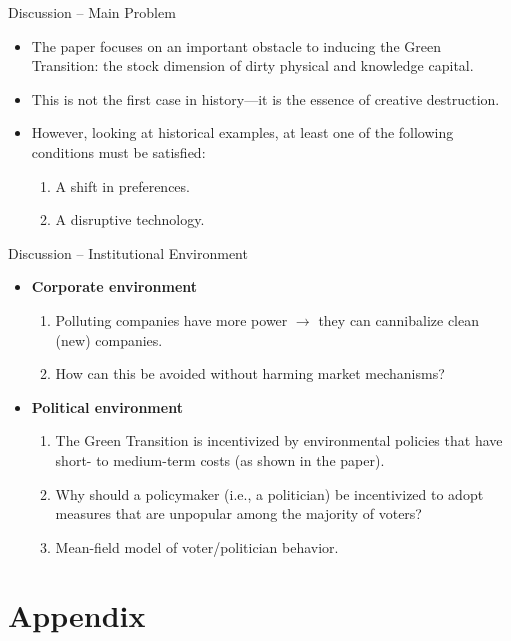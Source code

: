 \documentclass[aspectratio=169,xcolor=dvipsnames]{beamer}
\begin{document}
\begin{frame}{Discussion – Main Problem}
      \begin{itemize}
        \item The paper focuses on an important obstacle to inducing the Green Transition: the stock dimension of dirty physical and knowledge capital.
        \item This is not the first case in history—it is the essence of creative destruction.
        \item However, looking at historical examples, at least one of the following conditions must be satisfied:
        \begin{enumerate}
            \item A shift in preferences.
            \item A disruptive technology.
        \end{enumerate}
    \end{itemize}
\end{frame}

\begin{frame}{Discussion – Institutional Environment}
    \begin{itemize}
        \item \textbf{Corporate environment}
        \begin{enumerate}
            \item Polluting companies have more power $\rightarrow$ they can cannibalize clean (new) companies.
            \item How can this be avoided without harming market mechanisms?
        \end{enumerate}
        \item \textbf{Political environment}
        \begin{enumerate}
            \item The Green Transition is incentivized by environmental policies that have short- to medium-term costs (as shown in the paper).
            \item Why should a policymaker (i.e., a politician) be incentivized to adopt measures that are unpopular among the majority of voters?
            \item Mean-field model of voter/politician behavior.
        \end{enumerate}
    \end{itemize}
\end{frame}

\section{Appendix}
\end{document}
